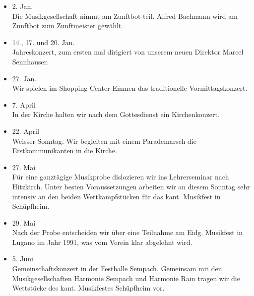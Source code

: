 \begin{history}


    \begin{itemize}

        \item[]2. Jan.\\
        Die Musikgesellschaft nimmt am Zunftbot teil. Alfred Bachmann wird am
        Zunftbot zum Zunftmeister gewählt.

        \item[]14., 17. und 20. Jan.\\
        Jahreskonzert, zum ersten mal dirigiert von unserem neuen Direktor
        Marcel Sennhauser.

        \item[]27. Jan.\\
        Wir spielen im Shopping Center Emmen das traditionelle
        Vormittagskonzert.

        \item[]7. April\\
        In der Kirche halten wir nach dem Gottesdienst ein Kirchenkonzert.

        \item[]22. April\\
        Weisser Sonntag. Wir begleiten mit einem Parademarsch die
        Erstkommunikanten in die Kirche.

        \item[]27. Mai\\
        Für eine ganztägige Musikprobe dislozieren wir ins Lehrerseminar nach
        Hitzkirch. Unter besten Voraussetzungen arbeiten wir an diesem Sonntag
        sehr intensiv an den beiden Wettkampfstücken für das kant. Musikfest in
        Schüpfheim.

        \item[]29. Mai\\
        Nach der Probe entscheiden wir über eine Teilnahme am Eidg. Musikfest in
        Lugano im Jahr 1991, was vom Verein klar abgelehnt wird.

        \item[]5. Juni\\
        Gemeinschaftskonzert in der Festhalle Sempach. Gemeinsam mit den
        Musikgesellschaften Harmonie Sempach und Harmonie Rain tragen wir die
        Wettstücke des kant. Musikfestes Schüpfheim vor.


\end{itemize}
\end{history}

